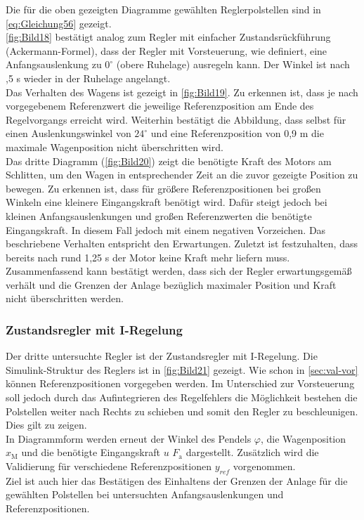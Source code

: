 \newpage
Die für die oben gezeigten Diagramme gewählten Reglerpolstellen sind in \autoref{eq:Gleichung56} gezeigt. \\
\newline
\autoref{fig:Bild18} bestätigt analog zum Regler mit einfacher Zustandsrückführung (Ackermann-Formel), dass der Regler mit Vorsteuerung, wie definiert, eine Anfangsauslenkung zu $0^\circ$ (obere Ruhelage) ausregeln kann. Der Winkel ist nach ,5 s wieder in der Ruhelage angelangt. \\
\newline
Das Verhalten des Wagens ist gezeigt in \autoref{fig:Bild19}. Zu erkennen ist, dass je nach vorgegebenem Referenzwert die jeweilige Referenzposition am Ende des Regelvorgangs erreicht wird. Weiterhin bestätigt die Abbildung, dass selbst für einen Auslenkungswinkel von $24^\circ$ und eine Referenzposition von 0,9 m die maximale Wagenposition nicht überschritten wird. \\
\newline
Das dritte Diagramm (\autoref{fig:Bild20}) zeigt die benötigte Kraft des Motors am Schlitten, um den Wagen in entsprechender Zeit an die zuvor gezeigte Position zu bewegen. Zu erkennen ist, dass für größere Referenzpositionen bei großen Winkeln eine kleinere Eingangskraft benötigt wird. Dafür steigt jedoch bei kleinen Anfangsauslenkungen und großen Referenzwerten die benötigte Eingangskraft. In diesem Fall jedoch mit einem negativen Vorzeichen. Das beschriebene Verhalten entspricht den Erwartungen. Zuletzt ist festzuhalten, dass bereits nach rund 1,25 s der Motor keine Kraft mehr liefern muss.\\
\newline
Zusammenfassend kann bestätigt werden, dass sich der Regler erwartungsgemäß verhält und die Grenzen der Anlage bezüglich maximaler Position und Kraft nicht überschritten werden.

\subsubsection{Zustandsregler mit I-Regelung} \label{sec:val_i_regler}

Der dritte untersuchte Regler ist der Zustandsregler mit I-Regelung. Die Simulink-Struktur des Reglers ist in \autoref{fig:Bild21} gezeigt. Wie schon in \autoref{sec:val-vor} können Referenzpositionen vorgegeben werden. Im Unterschied zur Vorsteuerung soll jedoch durch das Aufintegrieren des Regelfehlers die Möglichkeit bestehen die Polstellen weiter nach Rechts zu schieben und somit den Regler zu beschleunigen. Dies gilt zu zeigen. \\
In Diagrammform werden erneut der Winkel des Pendels $\varphi$, die Wagenposition $x_{\mathrm{M}}$ und die benötigte Eingangskraft $u$ \bzw $F_{\mathrm{a}}$ dargestellt. Zusätzlich wird die Validierung für verschiedene Referenzpositionen $y_{ref}$ vorgenommen. \\
Ziel ist auch hier das Bestätigen des Einhaltens der Grenzen der Anlage für die gewählten Polstellen bei untersuchten Anfangsauslenkungen und Referenzpositionen. 

